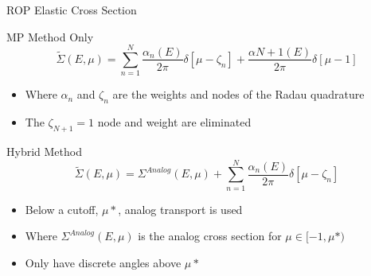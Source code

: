 \documentclass{beamer}
\begin{document}
    \begin{frame}{ROP Elastic Cross Section}

  \begin{block}{MP Method Only}
        $$\tilde{\Sigma}(E,\mu) = \sum_{n=1}^{N}\frac{\alpha_n(E)}{2\pi}\delta[\mu-\zeta_n]+\frac{\alpha{N+1}(E)}{2\pi}\delta[\mu-1]$$
    \begin{itemize}
      \item Where $\alpha_n$ and $\zeta_n$ are the weights and nodes of the Radau quadrature
      \item The $\zeta_{N+1}=1$ node and weight are eliminated
    \end{itemize}    
      \end{block}
    
      \begin{block}{Hybrid Method}
      $$\tilde{\Sigma}(E,\mu) = \Sigma^{Analog}(E,\mu) +\sum_{n=1}^{N}\frac{\alpha_n(E)}{2\pi}\delta[\mu-\zeta_n]$$
          \begin{itemize}
      \item Below a cutoff, $\mu*$, analog transport is used
      \item Where $ \Sigma^{Analog}(E,\mu)$ is the analog cross section for $\mu \in  [-1, \mu*)$
      \item Only have discrete angles above $\mu*$
    \end{itemize}    

  \end{block}


\end{frame}
\end{document}
